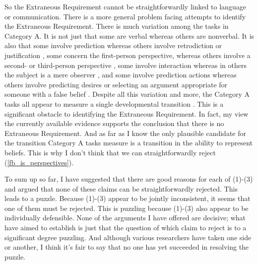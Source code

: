 \documentclass[12pt,\papersize]{extarticle}
\begin{document}
So the Extraneous Requirement cannot be straightforwardly linked to language or communication.
There is a more general problem facing attempts to identify the Extraneous Requirement.
There is much variation among the tasks in Category A.
It is not just that some are verbal whereas others are nonverbal.
It is also that some involve prediction whereas others involve retrodiction or justification \citep[e.g.][]{Wimmer:1998kx},
some concern the first-person perspective, whereas others involve a second- or third-person perspective \citep[e.g.][]{Gopnik:1991db},
some involve interaction whereas in others the subject is a mere observer \citep[e.g.][]{Chandler:1989qa},
and some involve prediction actions whereas others involve predicting desires \citep{Astington:1991kk} or selecting an argument appropriate for someone with a false belief \citep{Bartsch:2000es}.
Despite all this variation and more, the Category A tasks all appear to measure a single developmental transition \citep{Wellman:2001lz}.
This is a significant obstacle to identifying the Extraneous Requirement.
In fact, my view the currently available evidence supports the conclusion that there is no Extraneous Requirement.
And as far as I know the only plausible candidate for the transition  Category A tasks measure is a transition in the ability to represent beliefs.
This is why I don't think that we can straightforwardly reject  (\ref{fb_is_perspectives}).

To sum up so far, 
I have suggested that there are good reasons for each of (1)-(3) and 
argued that none of these claims can be straightforwardly rejected.
This leads to a puzzle.
Because (1)-(3) appear to be jointly inconsistent, it seems that one of them must be rejected.
This is puzzling because (1)-(3) also appear to be individually defensible.
None of the arguments I have offered are decisive; what have aimed to establish is just that the question of which claim to reject is to a significant degree puzzling.
And although various researchers have taken one side or another,
I think it's fair to say that no one has yet succeeded in resolving the puzzle.
\end{document}
